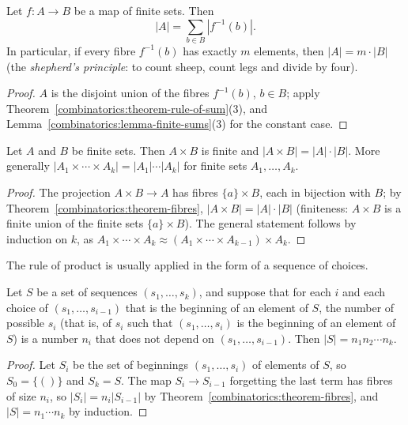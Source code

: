 \begin{theorem}[Fibres]\label{combinatorics:theorem-fibres}
Let $f \colon A \to B$ be a map of finite sets. Then
\[
|A| = \sum_{b \in B}|f^{-1}(b)|.
\]
In particular, if every fibre $f^{-1}(b)$ has exactly $m$ elements, then $|A| = m \cdot |B|$ (the \emph{shepherd's principle}: to count sheep, count legs and divide by four).
\end{theorem}

\begin{proof}
$A$ is the disjoint union of the fibres $f^{-1}(b)$, $b \in B$; apply Theorem~\ref{combinatorics:theorem-rule-of-sum}(3), and Lemma~\ref{combinatorics:lemma-finite-sums}(3) for the constant case.
\end{proof}

\begin{theorem}\label{combinatorics:theorem-rule-of-product}
Let $A$ and $B$ be finite sets. Then $A \times B$ is finite and $|A \times B| = |A| \cdot |B|$. More generally $|A_1 \times \cdots \times A_k| = |A_1| \cdots |A_k|$ for finite sets $A_1, \ldots, A_k$.
\end{theorem}

\begin{proof}
The projection $A \times B \to A$ has fibres $\{a\} \times B$, each in bijection with $B$; by Theorem~\ref{combinatorics:theorem-fibres}, $|A \times B| = |A| \cdot |B|$ (finiteness: $A \times B$ is a
finite union of the finite sets $\{a\} \times B$). The general statement follows by induction on $k$, as $A_1 \times \cdots \times A_k \approx (A_1 \times \cdots \times A_{k-1}) \times A_k$.
\end{proof}

The rule of product is usually applied in the form of a sequence of choices.

\begin{corollary}\label{combinatorics:corollary-successive-choices}
Let $S$ be a set of sequences $(s_1, \ldots, s_k)$, and suppose that for each $i$ and each choice of $(s_1, \ldots, s_{i-1})$ that is the beginning of an element of $S$, the number of possible $s_i$
(that is, of $s_i$ such that $(s_1, \ldots, s_i)$ is the beginning of an element of $S$) is a number $n_i$ that does not depend on $(s_1, \ldots, s_{i-1})$. Then $|S| = n_1n_2 \cdots n_k$.
\end{corollary}

\begin{proof}
Let $S_i$ be the set of beginnings $(s_1, \ldots, s_i)$ of elements of $S$, so $S_0 = \{()\}$ and $S_k = S$. The map $S_i \to S_{i-1}$ forgetting the last term has fibres of size $n_i$, so
$|S_i| = n_i|S_{i-1}|$ by Theorem~\ref{combinatorics:theorem-fibres}, and $|S| = n_1 \cdots n_k$ by induction.
\end{proof}

